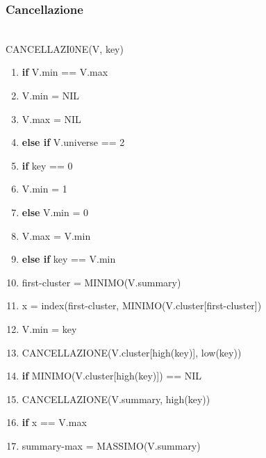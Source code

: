 \documentclass{article}
\begin{document}
\begin{flushleft}            
        \subsubsection{Cancellazione}
            ~\\CANCELLAZI0NE(V, key)
            \begin{enumerate}
                \item \textbf{if} V.min == V.max
                \item \hspace{10pt} V.min = NIL
                \item \hspace{10pt} V.max = NIL
                \item \textbf{else if} V.universe == 2
                \item \hspace{10pt} \textbf{if} key == 0
                \item \hspace{20pt} V.min = 1
                \item \hspace{10pt} \textbf{else} V.min = 0
                \item \hspace{10pt} V.max = V.min
                \item \textbf{else if} key == V.min
                \item \hspace{40pt} first-cluster = MINIMO(V.summary)
                \item \hspace{40pt} x = index(first-cluster, MINIMO(V.cluster[first-cluster])
                \item \hspace{40pt} V.min = key
                \item \hspace{20pt} CANCELLAZIONE(V.cluster[high(key)], low(key))
                \item \hspace{20pt} \textbf{if} MINIMO(V.cluster[high(key)]) == NIL
                \item \hspace{40pt} CANCELLAZIONE(V.summary, high(key))
                \item \hspace{40pt} \textbf{if} x == V.max
                \item \hspace{60pt} summary-max = MASSIMO(V.summary)

\end{enumerate}
\end{flushleft}
\end{document}
